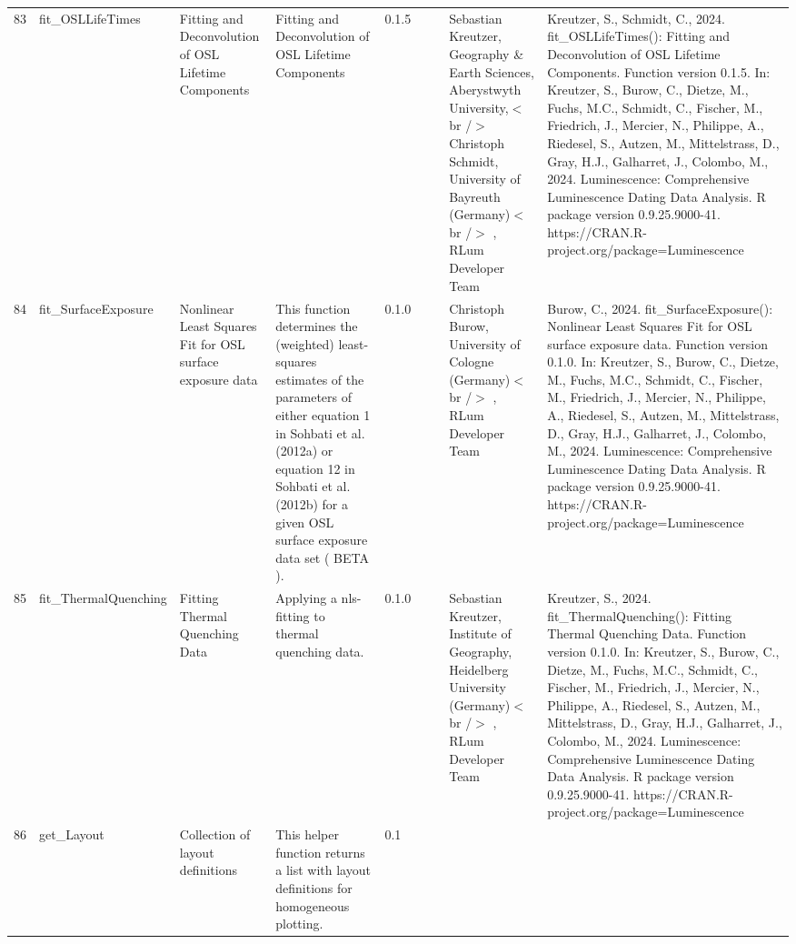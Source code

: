 \begin{table}[ht]
\begin{tabular}{rllllllll}
 \\ 
  83 & fit\_OSLLifeTimes & Fitting and Deconvolution of OSL Lifetime Components & Fitting and Deconvolution of OSL Lifetime Components & 0.1.5
 &  &  & Sebastian Kreutzer, Geography \& Earth Sciences, Aberystwyth University,$<$br /$>$ Christoph Schmidt, University of Bayreuth (Germany)$<$br /$>$ , RLum Developer Team & Kreutzer, S., Schmidt, C., 2024. fit\_OSLLifeTimes(): Fitting and Deconvolution of OSL Lifetime Components. Function version 0.1.5. In: Kreutzer, S., Burow, C., Dietze, M., Fuchs, M.C., Schmidt, C., Fischer, M., Friedrich, J., Mercier, N., Philippe, A., Riedesel, S., Autzen, M., Mittelstrass, D., Gray, H.J., Galharret, J., Colombo, M., 2024. Luminescence: Comprehensive Luminescence Dating Data Analysis. R package version 0.9.25.9000-41. https://CRAN.R-project.org/package=Luminescence
 \\ 
  84 & fit\_SurfaceExposure & Nonlinear Least Squares Fit for OSL surface exposure data & This function determines the (weighted) least-squares estimates of the parameters of either equation 1 in  Sohbati et al. (2012a)  or equation 12 in Sohbati et al. (2012b)  for a given OSL surface exposure data set ( BETA ). & 0.1.0
 &  &  & Christoph Burow, University of Cologne (Germany)$<$br /$>$ , RLum Developer Team & Burow, C., 2024. fit\_SurfaceExposure(): Nonlinear Least Squares Fit for OSL surface exposure data. Function version 0.1.0. In: Kreutzer, S., Burow, C., Dietze, M., Fuchs, M.C., Schmidt, C., Fischer, M., Friedrich, J., Mercier, N., Philippe, A., Riedesel, S., Autzen, M., Mittelstrass, D., Gray, H.J., Galharret, J., Colombo, M., 2024. Luminescence: Comprehensive Luminescence Dating Data Analysis. R package version 0.9.25.9000-41. https://CRAN.R-project.org/package=Luminescence
 \\ 
  85 & fit\_ThermalQuenching & Fitting Thermal Quenching Data & Applying a nls-fitting to thermal quenching data. & 0.1.0
 &  &  & Sebastian Kreutzer, Institute of Geography, Heidelberg University (Germany)$<$br /$>$ , RLum Developer Team & Kreutzer, S., 2024. fit\_ThermalQuenching(): Fitting Thermal Quenching Data. Function version 0.1.0. In: Kreutzer, S., Burow, C., Dietze, M., Fuchs, M.C., Schmidt, C., Fischer, M., Friedrich, J., Mercier, N., Philippe, A., Riedesel, S., Autzen, M., Mittelstrass, D., Gray, H.J., Galharret, J., Colombo, M., 2024. Luminescence: Comprehensive Luminescence Dating Data Analysis. R package version 0.9.25.9000-41. https://CRAN.R-project.org/package=Luminescence
 \\ 
  86 & get\_Layout & Collection of layout definitions & This helper function returns a list with layout definitions for homogeneous plotting. & 0.1

\end{tabular}
\end{table}
